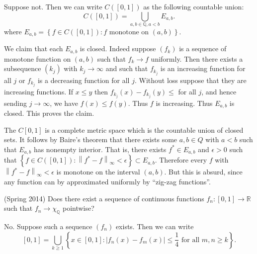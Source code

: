 \documentclass{exam}
\theoremstyle{problemstyle}
\newcommand{\norm}[1]{\left\lVert#1\right\rVert} %
\newcommand{\1}[1]{\textbf{1}_{\left[#1\right]}} %
\def\R{\mathbb{R}} %
\def\Q{\mathbb{Q}} %
\begin{document}
\begin{questions}

\begin{solution}
  Suppose not. Then we can write $C([0,1])$ as the following countable union:
  \begin{equation}
    C([0,1]) = \bigcup_{a,b\in \Q, a<b}E_{a,b}.
  \end{equation}
  where $E_{a,b}= \left\{ f\in C([0,1]): f \text{ monotone on }(a,b) \right\}.$
  
  We claim that each $E_{a,b}$ is closed. Indeed suppose $(f_{k})$ is a sequence of monotone function on $(a,b)$ such that $f_{k}\to f$ uniformly. Then there exists a subsequence $(k_{j})$ with $k_{j}\to \infty$ and such that $f_{k_{j}}$ is an increasing function for all $j$ or $f_{k_{j}}$ is a decreasing function for all $j$. Without loss suppose that they are increasing functions. If $x\leq y$ then $f_{k_{j}}(x)-f_{k_{j}}(y)\leq $ for all $j$, and hence sending $j\to \infty$, we have $f(x)\leq f(y)$. Thus $f$ is increasing. Thus $E_{a,b}$ is closed. This proves the claim.
  
  The $C[0,1]$ is a complete metric space which is the countable union of closed sets. It follows by Baire's theorem that there exists some $a,b\in Q$ with $a<b$ such that $E_{a,b}$ has nonempty interior. That is, there exists $f^{*}\in E_{a,b}$ and $\epsilon>0$ such that $\left\{ f\in C([0,1]): \norm{f^{*}-f}_{\infty} < \epsilon\right\}\subset E_{a,b}.$ Therefore every $f$ with $\norm{f^{*}-f}_{\infty}<\epsilon$ is monotone on the interval $(a,b)$. But this is absurd, since any function can by approximated uniformly by ``zig-zag functions''.

\end{solution}

\item (Spring 2014)
  Does there exist a sequence of continuous functions $f_{n}:[0,1]\to \R$ such that $f_{n}\to \chi_{\Q}$ pointwise?

\begin{solution}
  No. Suppose such a sequence $(f_{n})$ exists. Then we can write
  \begin{equation*}
    \left[ 0,1 \right] = \bigcup_{k\geq 1} \left\{ x\in [0,1]: \left| f_{n}(x)-f_{m}(x) \right| \leq \frac{1}{4} \text{ for all }m,n\geq k\right\}.
  \end{equation*}


\end{solution}
\end{questions}
\end{document}
